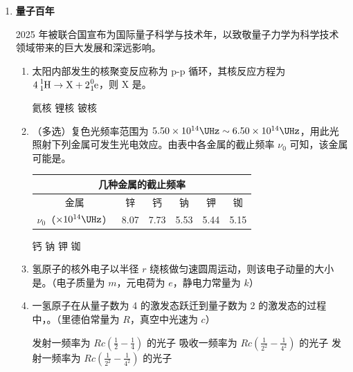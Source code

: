 \documentclass[\gkver]{gaokaozhenti}
\begin{document}
\begin{enumerate}
{2．根据偏振原理，偏振片 B 每转过半周透光强度从最小到最大、再到最小，可知光屏上两个光强最小的时间间隔为 $0.5T$，故选 C。

3．若从 c 侧观察，插入 c 时，应遮住 a、b；插入 d 时，应遮住 c 以及 a、b 的像；

该玻璃的折射率为 $n=\frac{\sin\theta_{1}}{\sin\theta_{2}}$。
}

\item
\textbf{量子百年}

2025 年被联合国宣布为国际量子科学与技术年，以致敬量子力学为科学技术领域带来的巨大发展和深远影响。
\begin{enumerate}
	\item
	太阳内部发生的核聚变反应称为 p-p 循环，其核反应方程为 $\ce{4^{1}_{1}H} \to \ce{X} + 2\ce{^{0}_{1}e}$，则 X 是。

	{氦核}
	{锂核}
	{铍核}

	\item
	（多选）复色光频率范围为 $5.50\times10^{14} \UHz \sim 6.50\times10^{14} \UHz$，用此光照射下列金属可发生光电效应。由表中各金属的截止频率 $\nu_{0}$ 可知，该金属可能是。

	\begin{center}
\begin{tabular}{|c|c|c|c|c|c|}
\hline
\multicolumn{6}{|c|}{几种金属的截止频率} \\ \hline
金属 & 锌 & 钙 & 钠 & 钾 & 铷 \\ \hline
$\nu_{0}$（$\times10^{14} \UHz$） & 8.07 & 7.73 & 5.53 & 5.44 & 5.15 \\ \hline
\end{tabular}
\end{center}

	{钙}
	{钠}
	{钾}
	{铷}

	\item
	氢原子的核外电子以半径 $r$ 绕核做匀速圆周运动，则该电子动量的大小是。（电子质量为 $m$，元电荷为 $e$，静电力常量为 $k$）

	\item
	一氢原子在从量子数为 4 的激发态跃迁到量子数为 2 的激发态的过程中，。（里德伯常量为 $R$，真空中光速为 $c$）

	{发射一频率为 $Rc\left(\frac{1}{2}-\frac{1}{4}\right)$ 的光子}
	{吸收一频率为 $Rc\left(\frac{1}{2^{2}}-\frac{1}{4^{2}}\right)$ 的光子}
	{发射一频率为 $Rc\left(\frac{1}{2^{2}}-\frac{1}{4^{2}}\right)$ 的光子}
\end{enumerate}
\end{enumerate}
\end{document}
